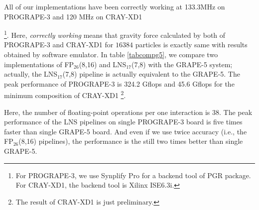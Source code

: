 \documentclass{article}
\begin{document}
All of our implementations have been correctly working at 133.3MHz on
PROGRAPE-3 and 120 MHz on CRAY-XD1{\footnote{For PROGRAPE-3, we use
Synplify Pro for a backend tool of PGR package. For CRAY-XD1, the
backend tool is Xilinx ISE6.3i.}.  Here, {\it correctly working} means
that gravity force calculated by both of PROGRAPE-3 and CRAY-XD1 for
$16384$ particles is exactly same with results obtained by software
emulator.  In table \ref{tabcompg5}, we compare two implementations of
FP$_{26}$(8,16) and LNS$_{17}$(7,8) with the GRAPE-5
system\cite{KFMT00}; actually, the LNS$_{17}$(7,8) pipeline is
actually equivalent to the GRAPE-5.  The peak performance of
PROGRAPE-3 is 324.2 Gflops and 45.6 Gflops for the minimum composition of CRAY-XD1
\footnote{The result of CRAY-XD1 is just preliminary.}.

Here, the number of floating-point operations per one interaction is 38\cite{MT98}.
The peak performance of the LNS pipelines on single PROGRAPE-3
board is five times faster than single GRAPE-5 board.
And even if we use twice accuracy (i.e., the FP$_{26}$(8,16) pipelines),
the performance is the still two times better than single GRAPE-5.


}
\end{document}
